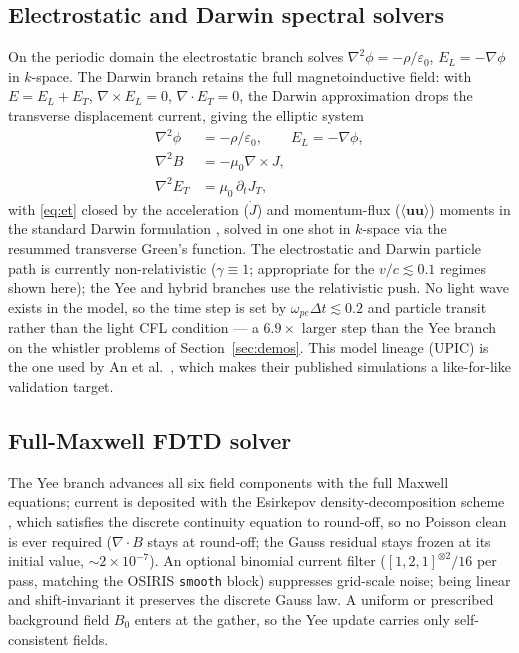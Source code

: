 \documentclass[11pt]{article}
\begin{document}
\subsection{Electrostatic and Darwin spectral solvers}
\label{sec:model-darwin}
On the periodic domain the electrostatic branch solves
$\nabla^2\phi=-\rho/\varepsilon_0$, $E_L=-\nabla\phi$ in $k$-space.
The Darwin branch retains the full magnetoinductive field: with
$E=E_L+E_T$, $\nabla\times E_L=0$, $\nabla\cdot E_T=0$, the Darwin
approximation drops the transverse displacement current, giving the
elliptic system
\begin{align}
  \nabla^2 \phi &= -\rho/\varepsilon_0, \qquad E_L=-\nabla\phi,\\
  \nabla^2 B &= -\mu_0 \nabla\times J,\\
  \nabla^2 E_T &= \mu_0\,\partial_t J_T,
  \label{eq:et}
\end{align}
with \eqref{eq:et} closed by the acceleration ($\dot J$) and
momentum-flux ($\langle\mathbf{uu}\rangle$) moments in the standard
Darwin formulation \cite{nielson1976}, solved in one shot in $k$-space
via the resummed transverse Green's function. The electrostatic and
Darwin particle path is currently non-relativistic ($\gamma\equiv1$;
appropriate for the $v/c\lesssim0.1$ regimes shown here); the Yee and
hybrid branches use the relativistic push. No light wave exists in
the model, so the time step is set by $\omega_{pe}\Delta t\lesssim0.2$
and particle transit rather than the light CFL condition --- a
$6.9\times$ larger step than the Yee branch on the whistler problems of
Section~\ref{sec:demos}. This model lineage (UPIC) is the one used by
An et al.~\cite{an2019}, which makes their published simulations a
like-for-like validation target.

\subsection{Full-Maxwell FDTD solver}
\label{sec:model-yee}
The Yee branch \cite{yee1966} advances all six field components with
the full Maxwell equations; current is deposited with the Esirkepov
density-decomposition scheme \cite{esirkepov2001}, which satisfies the
discrete continuity equation to round-off, so no Poisson clean is ever
required ($\nabla\cdot B$ stays at round-off; the Gauss residual stays
frozen at its initial value, ${\sim}2\times10^{-7}$). An optional
binomial current filter ($[1,2,1]^{\otimes2}/16$ per pass, matching the
OSIRIS \texttt{smooth} block) suppresses grid-scale noise; being linear
and shift-invariant it preserves the discrete Gauss law. A uniform or
prescribed background field $B_0$ enters at the gather, so the Yee
update carries only self-consistent fields.
\end{document}
